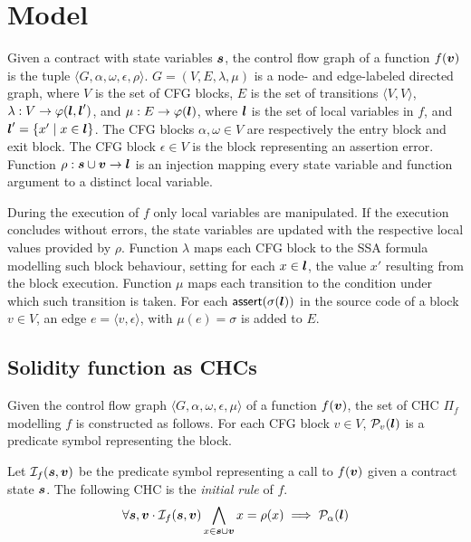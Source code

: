 \newpage
\section{Model}

Given a contract with state variables $\boldsymbol{s}$,
the control flow graph of a function $f(\boldsymbol{v})$ 
is the tuple \mbox{$\langle G,\alpha,\omega,\epsilon,\rho\rangle$}.
\mbox{$G=(V,E,\lambda,\mu)$} 
is a node- and edge-labeled directed graph,
where $V$ is the set of CFG blocks, $E$ is the set of transitions 
$\langle V,V\rangle$,
\mbox{$\lambda:V\rightarrow\varphi(\boldsymbol{l},
\boldsymbol{l}')$}, and \mbox{$\mu:E\rightarrow\varphi(\boldsymbol{l})$},
where $\boldsymbol{l}$ is the set of local 
variables in $f$, and \mbox{$\boldsymbol{l}'=\{x'\mid x\in\boldsymbol{l}\}$}. 
The CFG blocks $\alpha,\omega\in V$ are respectively the entry 
block and exit block. The CFG block $\epsilon\in V$ is the block
representing an assertion error.
Function \mbox{$\rho:\boldsymbol{s}\cup\boldsymbol{v}\rightarrow\boldsymbol{l}$} is 
an injection mapping every state variable and function 
argument to a distinct local variable. 

During the execution of $f$ only local variables are manipulated. If
the execution concludes without errors, the state variables
are updated with the respective local values
provided by $\rho$.
%
Function $\lambda$ maps each CFG block to 
the SSA formula modelling such block behaviour, setting for each 
$x\in\boldsymbol{l}$, the value $x'$ resulting from the block
execution.
Function $\mu$ maps each transition to the condition 
under which such transition is taken.
For each \mbox{$\mathsf{assert}(\sigma(\boldsymbol{l}))$} in the 
source code of a block $v\in V$, an edge 
\mbox{$e=\langle v,\epsilon\rangle$}, with \mbox{$\mu(e)=\sigma$}
is added to $E$.

\subsection{Solidity function as CHCs}
Given the control flow graph 
\mbox{$\langle G,\alpha,\omega,\epsilon,\mu\rangle$} 
of a function $f(\boldsymbol{v})$, the set of CHC $\Pi_f$ modelling $f$ 
is constructed
as follows. 
%
For each CFG block $v\in V$, $\mathcal{P}_v(\boldsymbol{l})$ 
is a predicate symbol representing the block.

Let $\mathcal{I}_f(\boldsymbol{s},\boldsymbol{v})$ be the predicate symbol
representing a call to $f(\boldsymbol{v})$ given a contract state $\boldsymbol{s}$.
The following CHC is the {\em initial rule} of $f$.
\begin{align}
\label{eq:CHC-initial}
\forall\svar,\farg\cdot\inP_f(\svar,\farg)\bigwedge_{x\in\svar\cup\farg}x=\rho(x)\implies\pred_\alpha(\lvar)
\end{align}

